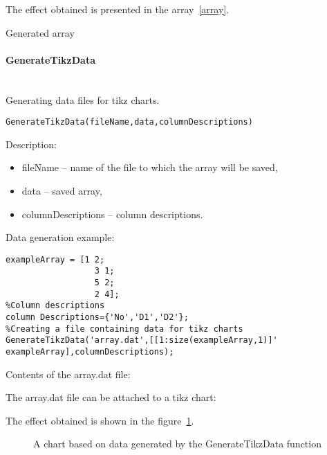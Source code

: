 The effect obtained is presented in the array~\ref{array}.

\begin{table}

\caption{Generated array}
\label{array}
\end{table}

\paragraph{GenerateTikzData} \hspace{0pt} \\
Generating data files for tikz charts.
\begin{lstlisting}[style=Matlab-editor]
GenerateTikzData(fileName,data,columnDescriptions)
\end{lstlisting}

Description:
\begin{itemize}
\item fileName -- name of the file to which the array will be saved,
\item data -- saved array,
\item columnDescriptions -- column descriptions.
\end{itemize}

Data generation example:
\begin{lstlisting}[style=Matlab-editor]
%Array
exampleArray = [1 2;
                  3 1;
                  5 2;
                  2 4];
%Column descriptions
column Descriptions={'No','D1','D2'};
%Creating a file containing data for tikz charts
GenerateTikzData('array.dat',[[1:size(exampleArray,1)]' exampleArray],columnDescriptions);
\end{lstlisting}

Contents of the array.dat file:


The array.dat file can be attached to a tikz chart:


The effect obtained is shown in the figure~\ref{Fig:array}.

\begin{figure}

\caption{A chart based on data generated by the GenerateTikzData function}
\label{Fig:array}
\end{figure}

